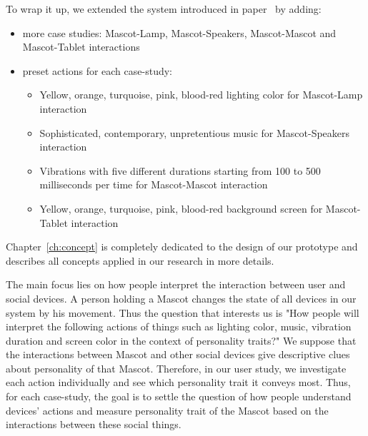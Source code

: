To wrap it up, we extended the system introduced in paper~\cite{okada2016autonomous} by adding:
\begin{itemize}
    \item more case studies: Mascot-Lamp, Mascot-Speakers, Mascot-Mascot and Mascot-Tablet interactions
    \item preset actions for each case-study:
    \begin{itemize}
        \item Yellow, orange, turquoise, pink, blood-red lighting color for Mascot-Lamp interaction
        \item Sophisticated, contemporary, unpretentious music for Mascot-Speakers interaction
        \item Vibrations with five different durations starting from 100 to
        500 milliseconds per time for Mascot-Mascot interaction
        \item Yellow, orange, turquoise, pink, blood-red background screen for Mascot-Tablet interaction
    \end{itemize}
\end{itemize}
Chapter~\ref{ch:concept} is completely dedicated to the design of our prototype and
describes all concepts applied in our research in more details.

The main focus lies on how people interpret the interaction between user and social devices.
A person holding a Mascot changes the state of all devices in our system by his movement.
Thus the question that interests us is "How people will interpret the following actions of things such as
lighting color, music, vibration duration and screen color in the context of personality traits?"
We suppose that the interactions between Mascot and other social
devices give descriptive clues about personality of that Mascot.
Therefore, in our user study, we investigate each action individually and see which personality trait it conveys most.
Thus, for each case-study, the goal is to settle the question of how people understand devices' actions
and measure personality trait of the Mascot based on the interactions between these social things.

